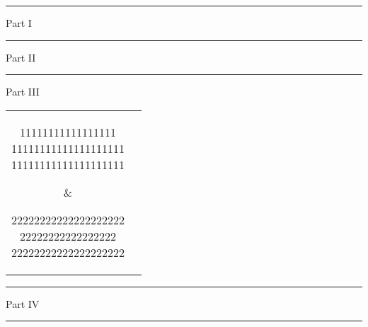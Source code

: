 \documentclass{article}
\begin{document}
\newlength{\halfwd}
%

\def\lt{%
  \setlength\extrarowheight{12pt}%
  \begin{longtable}{cc}%
    \parbox[t]{\halfwd}{%
    11111111111111111\\
    11111111111111111111\\
    11111111111111111111}&
    \parbox[t]{\halfwd}{22222222222222222222\\
    22222222222222222\\
    22222222222222222222}\\

    \parbox[t]{\halfwd}{33333333333333333333\\
    33333333333333333333\\
    33333333333333333333}&
    \parbox[t]{\halfwd}{44444444444444444444\\
    44444444444444444444\\
    44444444444444444444}\\

    \parbox[t]{\halfwd}{55555555555555555555\\
    55555555555555555555\\
    55555555555555555555}&
    \parbox[t]{\halfwd}{66666666666666666666\\
    66666666666666666666\\
    66666666666666666666}\\
  \end{longtable}
}

  \begin{center}
    \hrule
    Part I

    \vfill
    \hrule
    \vfill
    Part II

    \vfill
    \hrule
    \vfill

    Part III

    {\ttfamily \lt}
    \vfill
    \hrule
    \vfill
    Part IV

    \vfill
    \hrule
  \end{center}
\end{document}
